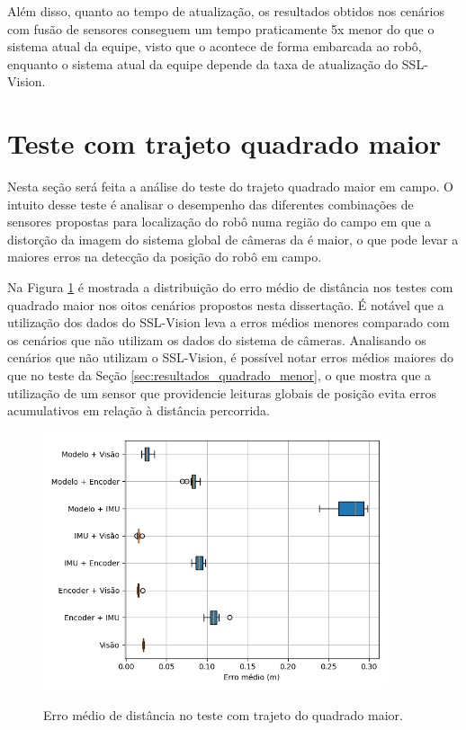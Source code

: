 \documentclass[acronym, symbols, table, deposito]{fei}
\begin{document}
	Além disso, quanto ao tempo de atualização, os resultados obtidos nos cenários com fusão de sensores conseguem um tempo praticamente 5x menor do que o sistema atual da equipe, visto que o  acontece de forma embarcada ao robô, enquanto o sistema atual da equipe depende da taxa de atualização do SSL-Vision.

	\section{Teste com trajeto quadrado maior} \label{sec:resultados_quadrado_maior}
	
		Nesta seção será feita a análise do teste do trajeto quadrado maior em campo. O intuito desse teste é analisar o desempenho das diferentes combinações de sensores propostas para localização do robô numa região do campo em que a distorção da imagem do sistema global de câmeras da  é maior, o que pode levar a maiores erros na detecção da posição do robô em campo.
		
		Na Figura \ref{fig:erro_medio_distancia_quad_maior} é mostrada a distribuição do erro médio de distância nos testes com quadrado maior nos oitos cenários propostos nesta dissertação. É notável que a utilização dos dados do SSL-Vision leva a erros médios menores comparado com os cenários que não utilizam os dados do sistema de câmeras. Analisando os cenários que não utilizam o SSL-Vision, é possível notar erros médios maiores do que no teste da Seção \ref{sec:resultados_quadrado_menor}, o que mostra que a utilização de um sensor que providencie leituras globais de posição evita erros acumulativos em relação à distância percorrida.
		
		\begin{figure}[!htb]
			\centering
			\caption{Erro médio de distância no teste com trajeto do quadrado maior.}
			\includegraphics[width=0.9\textwidth]{../Dados/Graficos-Resultados/erro_medio_distancia_quadrado_maior.png}
			\label{fig:erro_medio_distancia_quad_maior}
		\end{figure}
	
\end{document}
